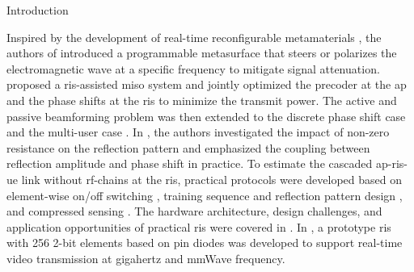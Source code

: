 \begin{section}{Introduction}
\begin{subsection}{}
		Inspired by the development of real-time reconfigurable metamaterials \cite{Cui2014}, the authors of \cite{Liaskos2018} introduced a programmable metasurface that steers or polarizes the electromagnetic wave at a specific frequency to mitigate signal attenuation. \cite{Wu2018} proposed a \gls{ris}-assisted \gls{miso} system and jointly optimized the precoder at the \gls{ap} and the phase shifts at the \gls{ris} to minimize the transmit power. The active and passive beamforming problem was then extended to the discrete phase shift case \cite{Wu2019a} and the multi-user case \cite{Wu2019}. In \cite{Abeywickrama2020}, the authors investigated the impact of non-zero resistance on the reflection pattern and emphasized the coupling between reflection amplitude and phase shift in practice. To estimate the cascaded \gls{ap}-\gls{ris}-\gls{ue} link without \gls{rf}-chains at the \gls{ris}, practical protocols were developed based on element-wise on/off switching \cite{Nadeem2019}, training sequence and reflection pattern design \cite{You2019,Kang2020}, and compressed sensing \cite{Wang2020}. The hardware architecture, design challenges, and application opportunities of practical \gls{ris} were covered in \cite{Wu2020}. In \cite{Dai2020}, a prototype \gls{ris} with \num{256} \num{2}-bit elements based on \gls{pin} diodes was developed to support real-time video transmission at gigahertz and mmWave frequency.
	\end{subsection}



\end{section}
